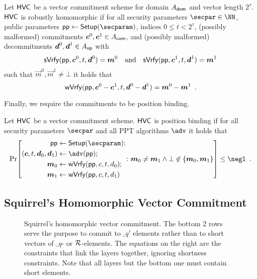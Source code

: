 \begin{definition} \label{def:malhomhvc}
  Let $\mathsf{HVC}$ be a vector commitment scheme for domain $A_{\mathsf{dom}}$ and vector length $2^\tau$. %
  $\mathsf{HVC}$ is robustly homomorphic if for all security parameters $\secpar\in\NN$, public parameters $\params\gets\setup(\secparam)$, indices $0\leq t < 2^\tau$, (possibly malformed) commitments $\boldsymbol{c}^0,\boldsymbol{c}^1 \in A_{\mathsf{com}}$, and (possibly malformed) decommitments $\boldsymbol{d}^0,\boldsymbol{d}^1\in A_{\mathsf{op}}$ with
  \[
    \mathsf{sVrfy}(\mathsf{pp},\boldsymbol{c}^0, t,\boldsymbol{d}^0)=\boldsymbol{m}^0 \quad \text{and} \quad \mathsf{sVrfy}(\mathsf{pp},\boldsymbol{c}^1, t,\boldsymbol{d}^1)=\boldsymbol{m}^1
  \]
  such that $\vec{m}^0,\vec{m}^1\neq \bot$ it holds that
  \[
    \mathsf{wVrfy}(\mathsf{pp},\boldsymbol{c}^0 - \boldsymbol{c}^1, t,\boldsymbol{d}^0 - \boldsymbol{d}^1)=\boldsymbol{m}^0 - \boldsymbol{m}^1\enspace.
  \]
\end{definition}
%
Finally, we require the commitments to be position binding.
\begin{definition}\label{def:position_binding}
  Let $\mathsf{HVC}$ be a vector commitment scheme.
  $\mathsf{HVC}$ is position binding if for all security parameters $\secpar$ and all PPT algorithms $\adv$ it holds that
  \[
    \Pr\mleft[
      \begin{aligned}
      \params\gets{}&\setup(\secparam);\\
      (\vec{c},t,\vec{d}_0,\vec{d}_1) \gets{}& \adv(\params);\\
      \vec{m}_0 \gets{}& \wverify(\params,c,t,d_0);\\
      \vec{m}_1 \gets{}& \wverify(\params,c,t,d_1)
      \end{aligned}\colon
      \vec{m}_0\neq \vec{m}_1 \land \bot\not\in\{\vec{m}_0,\vec{m}_1\}
    \mright]\leq \negl\enspace.
  \]
\end{definition}

\subsection{Squirrel's Homomorphic Vector Commitment}\label{subsec:squirrelrecap}

\begin{figure}[h]
{
\def\svgwidth{\textwidth}

}
\caption{Squirrel's homomorphic vector commitment. The bottom 2 rows serve the purpose to commit to $\ring_{q'}$ elements rather than to short vectors of $\ring_q$- or $\mathcal{R}$-elements. The equations on the right are the constraints that link the layers together, ignoring shortness constraints. Note that all layers but the bottom one must contain short elements.}\label{fig:squirreltree}
\end{figure}

